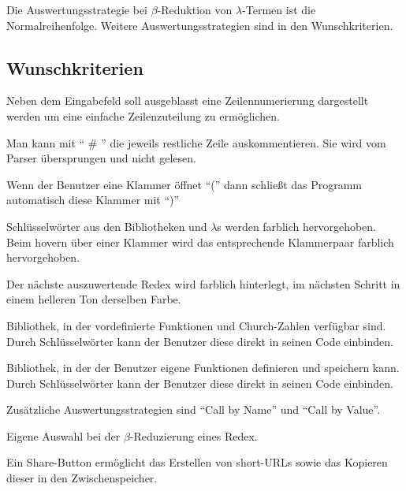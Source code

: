 \documentclass[parskip=full,11pt,twoside]{scrartcl}
\begin{document}
Die Auswertungsstrategie bei $\beta$-Reduktion von $\lambda$-Termen ist die Normalreihenfolge. Weitere Auswertungsstrategien sind in den Wunschkriterien.


\newpage
\subsection{Wunschkriterien}

Neben dem Eingabefeld soll ausgeblasst eine Zeilennumerierung dargestellt werden um eine einfache Zeilenzuteilung zu ermöglichen.

Man kann mit \enquote{ \# } die jeweils restliche Zeile auskommentieren. Sie wird vom Parser übersprungen und nicht gelesen.

Wenn der Benutzer eine Klammer öffnet \enquote{(} dann schließt das Programm automatisch diese Klammer mit \enquote{)}

Schlüsselwörter aus den Bibliotheken und $\lambda$s werden farblich hervorgehoben. Beim hovern über einer Klammer wird das entsprechende Klammerpaar farblich hervorgehoben.

Der nächste auszuwertende Redex wird farblich hinterlegt, im nächsten Schritt in einem helleren Ton derselben Farbe.

Bibliothek, in der vordefinierte Funktionen und Church-Zahlen verfügbar sind. Durch Schlüsselwörter kann der Benutzer diese direkt in seinen Code einbinden.

Bibliothek, in der der Benutzer eigene Funktionen definieren und speichern kann. Durch Schlüsselwörter kann der Benutzer diese direkt in seinen Code einbinden.

Zusätzliche Auswertungsstrategien sind \enquote{Call by Name} und \enquote{Call by Value}.

Eigene Auswahl bei der $\beta$-Reduzierung eines Redex.

Ein Share-Button ermöglicht das Erstellen von short-URLs sowie das Kopieren dieser in den Zwischenspeicher.
\end{document}
